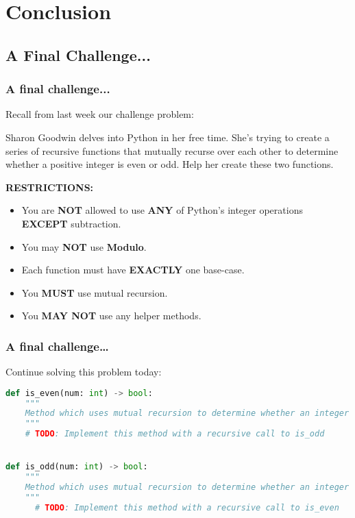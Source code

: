 \documentclass[hyperref={colorlinks,citecolor=blue,linkcolor=blue,urlcolor=blue}]{beamer}
\begin{document}
\section{Conclusion}
\subsection{A Final Challenge...}

\begin{frame}
  \frametitle{A final challenge...}
Recall from last week our challenge problem:

Sharon Goodwin delves into Python in her free time. She's trying to create a series of recursive functions that mutually recurse over each other to determine whether a positive integer is even or odd. Help her create these two functions.
\begin{center}
  \textbf{RESTRICTIONS:}
  \begin{itemize}
    \item You are \textbf{NOT} allowed to use \textbf{ANY} of Python's integer operations \textbf{EXCEPT} subtraction.
    \item You may \textbf{NOT} use \textbf{Modulo}.
    \item Each function must have \textbf{EXACTLY} one base-case.
    \item You \textbf{MUST} use mutual recursion.
    \item You \textbf{MAY NOT} use any helper methods.
  \end{itemize}  
\end{center}
\end{frame}
\begin{frame}[fragile]
  \frametitle{A final challenge\ldots}
  Continue solving this problem today: 
  \begin{lstlisting}[language=Python, style=mystyle]
def is_even(num: int) -> bool:
    """
    Method which uses mutual recursion to determine whether an integer is even or odd.
    """
    # TODO: Implement this method with a recursive call to is_odd


def is_odd(num: int) -> bool:
    """
    Method which uses mutual recursion to determine whether an integer is even or odd.
    """
      # TODO: Implement this method with a recursive call to is_even
    \end{lstlisting}    
\end{frame}
\end{document}
